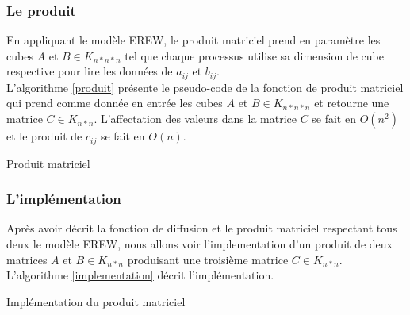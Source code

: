 \subsubsection{Le produit}

En appliquant le modèle EREW, le produit matriciel prend en paramètre les cubes $A$ et $B \in K_{n*n*n}$ tel que chaque processus utilise sa dimension de cube respective pour lire les données de $a_{ij}$ et $b_{ij}$.\\

L'algorithme \ref{produit} présente le pseudo-code de la fonction de produit matriciel qui prend comme donnée en entrée les cubes $A$ et $B \in K_{n*n*n}$ et retourne une matrice $C \in K_{n*n}$. L'affectation des valeurs dans la matrice $C$ se fait en $O(n^2)$ et le produit de $c_{ij}$ se fait en $O(n)$.

\incmargin{1em}
\begin{algorithm}[here]
  \dontprintsemicolon
  \label{produit}
  \caption{Produit matriciel}
\end{algorithm}
\decmargin{1em}

\subsubsection{L'implémentation}

Après avoir décrit la fonction de diffusion et le produit matriciel respectant tous deux le modèle EREW, nous allons voir l'implementation d'un produit de deux matrices $A$ et $B \in K_{n*n}$ produisant une troisième matrice $C \in K_{n*n}$.\\

L'algorithme \ref{implementation} décrit l'implémentation.

\incmargin{1em}
\begin{algorithm}[here]
  \dontprintsemicolon
  \label{implementation}
  \caption{Implémentation du produit matriciel}
\end{algorithm}
\decmargin{1em}

